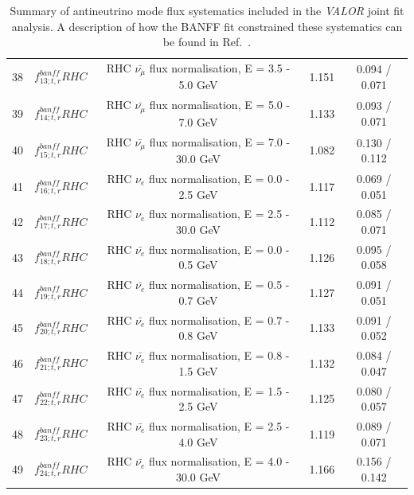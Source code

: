 {\begin{table}
\begin{tabular}{| c | c | c | c | c |}
38 & $f_{13; t, r}^{banff} RHC$ & RHC $\bar{\nu_\mu}$ flux normalisation, E = 3.5 - 5.0 GeV   & 1.151   & 0.094 / 0.071 \\  
39 & $f_{14; t, r}^{banff} RHC$ & RHC $\bar{\nu_\mu}$ flux normalisation, E = 5.0 - 7.0 GeV   & 1.133   & 0.093 / 0.071 \\  
40 & $f_{15; t, r}^{banff} RHC$ & RHC $\bar{\nu_\mu}$ flux normalisation, E = 7.0 - 30.0 GeV  & 1.082   & 0.130 / 0.112 \\  
41 & $f_{16; t, r}^{banff} RHC$ & RHC $\nu_e$ flux normalisation, E = 0.0 - 2.5 GeV           & 1.117   & 0.069 / 0.051 \\  
42 & $f_{17; t, r}^{banff} RHC$ & RHC $\nu_e$ flux normalisation, E = 2.5 - 30.0 GeV          & 1.112   & 0.085 / 0.071 \\  
43 & $f_{18; t, r}^{banff} RHC$ & RHC $\bar{\nu_e}$ flux normalisation, E = 0.0 - 0.5 GeV     & 1.126   & 0.095 / 0.058 \\  
44 & $f_{19; t, r}^{banff} RHC$ & RHC $\bar{\nu_e}$ flux normalisation, E = 0.5 - 0.7 GeV     & 1.127   & 0.091 / 0.051 \\  
45 & $f_{20; t, r}^{banff} RHC$ & RHC $\bar{\nu_e}$ flux normalisation, E = 0.7 - 0.8 GeV     & 1.133   & 0.091 / 0.052 \\  
46 & $f_{21; t, r}^{banff} RHC$ & RHC $\bar{\nu_e}$ flux normalisation, E = 0.8 - 1.5 GeV     & 1.132   & 0.084 / 0.047 \\  
47 & $f_{22; t, r}^{banff} RHC$ & RHC $\bar{\nu_e}$ flux normalisation, E = 1.5 - 2.5 GeV     & 1.125   & 0.080 / 0.057 \\  
48 & $f_{23; t, r}^{banff} RHC$ & RHC $\bar{\nu_e}$ flux normalisation, E = 2.5 - 4.0 GeV     & 1.119   & 0.089 / 0.071 \\  
49 & $f_{24; t, r}^{banff} RHC$ & RHC $\bar{\nu_e}$ flux normalisation, E = 4.0 - 30.0 GeV    & 1.166   & 0.156 / 0.142 \\  

\hline

\end{tabular}

\caption{
Summary of antineutrino mode flux systematics included in the {\em VALOR} joint fit analysis.
A description of how the BANFF fit constrained these systematics can be found in Ref.~\cite{BANFF2015}.
}
\label{tab:banff_uncertainties_flux_rhc}

\end{table}





}
